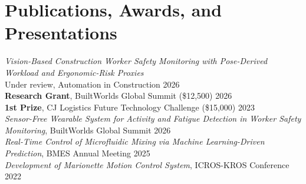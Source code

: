 \documentclass[letterpaper,10pt]{extarticle}
\begin{document}
\section{Publications, Awards, and Presentations}
\textit{Vision-Based Construction Worker Safety Monitoring with Pose-Derived Workload and
Ergonomic-Risk Proxies}\\
Under review, Automation in Construction \hfill 2026\\[2pt]
\textbf{Research Grant}, BuiltWorlds Global Summit (\$12,500) \hfill 2026\\
\textbf{1st Prize}, CJ Logistics Future Technology Challenge (\$15,000) \hfill 2023\\[2pt]
\textit{Sensor-Free Wearable System for Activity and Fatigue Detection in Worker Safety Monitoring},
BuiltWorlds Global Summit \hfill 2026\\
\textit{Real-Time Control of Microfluidic Mixing via Machine Learning-Driven Prediction},
BMES Annual Meeting \hfill 2025\\
\textit{Development of Marionette Motion Control System}, ICROS-KROS Conference \hfill 2022
\end{document}
